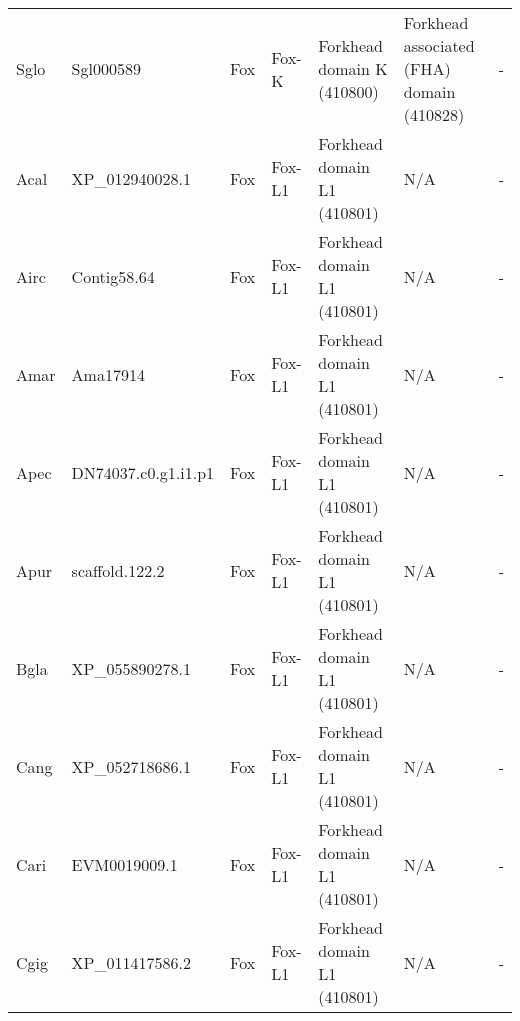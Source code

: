\documentclass[../main.tex]{subfiles}
\begin{document}
\begin{landscape}
\begin{longtable}{lllllll}
		Sglo           & Sgl000589             & Fox            & Fox-K               & Forkhead domain K (410800)                  & Forkhead associated (FHA) domain (410828)                              & -                    \\
		Acal           & XP\_012940028.1       & Fox            & Fox-L1              & Forkhead domain L1 (410801)                 & N/A                                                                    & -                    \\
		Airc           & Contig58.64           & Fox            & Fox-L1              & Forkhead domain L1 (410801)                 & N/A                                                                    & -                    \\
		Amar           & Ama17914              & Fox            & Fox-L1              & Forkhead domain L1 (410801)                 & N/A                                                                    & -                    \\
		Apec           & DN74037.c0.g1.i1.p1   & Fox            & Fox-L1              & Forkhead domain L1 (410801)                 & N/A                                                                    & -                    \\
		Apur           & scaffold.122.2        & Fox            & Fox-L1              & Forkhead domain L1 (410801)                 & N/A                                                                    & -                    \\
		Bgla           & XP\_055890278.1       & Fox            & Fox-L1              & Forkhead domain L1 (410801)                 & N/A                                                                    & -                    \\
		Cang           & XP\_052718686.1       & Fox            & Fox-L1              & Forkhead domain L1 (410801)                 & N/A                                                                    & -                    \\
		Cari           & EVM0019009.1          & Fox            & Fox-L1              & Forkhead domain L1 (410801)                 & N/A                                                                    & -                    \\
		Cgig           & XP\_011417586.2       & Fox            & Fox-L1              & Forkhead domain L1 (410801)                 & N/A                                                                    & -                    \\

\end{longtable}
\end{landscape}
\end{document}

